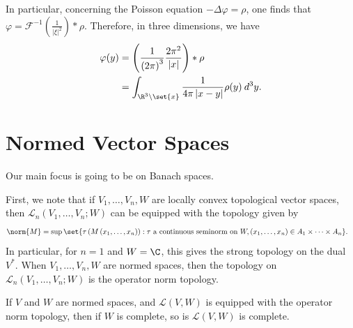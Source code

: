 \documentclass[10pt]{mypackage}
\begin{document}
\begin{example}
  In particular, concerning the Poisson equation $-\Delta \varphi = \rho$, one finds that $\varphi = \mathcal{F}^{-1}\left( \frac{1}{\left\vert \xi \right\vert^2} \right)\ast\rho$. Therefore, in three dimensions, we have
  \begin{align*}
    \varphi(y) &= \left( \frac{1}{\left( 2\pi \right)^3}\frac{2\pi^2}{\left\vert x \right\vert} \right)\ast \rho\\
               &= \int_{\R^3\setminus\set{x}}^{} \frac{1}{4\pi \left\vert x-y \right\vert}\rho(y)\:d^{3}y.
  \end{align*}
\end{example}
\section{Normed Vector Spaces}%
Our main focus is going to be on Banach spaces.

First, we note that if $V_1,\dots,V_n,W$ are locally convex topological vector spaces, then $\mathcal{L}_n\left( V_1,\dots,V_n;W \right)$ can be equipped with the topology given by
\begin{align*}
  \norm{M} &= \sup\set{ \tau\left( M\left( x_1,\dots,x_n \right) \right) : \tau\text{ a continuous seminorm on }W,\left( x_1,\dots,x_n \right)\in A_1\times\cdots\times A_n }.
\end{align*}
In particular, for $n = 1$ and $W = \C$, this gives the strong topology on the dual $V^{\ast}$. When $V_1,\dots,V_n,W$ are normed spaces, then the topology on $\mathcal{L}_n\left( V_1,\dots,V_n;W \right)$ is the operator norm topology.
\begin{proposition}
  If $V$ and $W$ are normed spaces, and $\mathcal{L}\left( V,W \right)$ is equipped with the operator norm topology, then if $W$ is complete, so is $\mathcal{L}\left( V,W \right)$ is complete.
\end{proposition}
\end{document}
